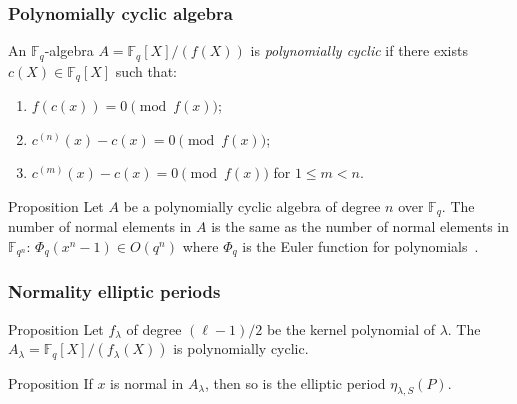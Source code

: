 \documentclass[francais]{beamer}
\def\F {\ensuremath{\mathbb{F}}}
\begin{document}
\begin{frame}\frametitle{Polynomially cyclic algebra}
  \begin{definition}
    An $\F_q$-algebra $A = \F_q[X]/(f(X))$ is \emph{polynomially cyclic}
    if there exists $c(X) \in \F_q[X]$ such that:
    \begin{enumerate}
    \item $f(c(x)) = 0 \pmod{f(x)}$;
    \item $c^{(n)}(x) - c(x) = 0 \pmod{f(x)}$;
    \item  $c^{(m)}(x) - c(x) = 0 \pmod{f(x)}$ for $1 \leq m < n$.
    \end{enumerate}
  \end{definition}

  \begin{block}{Proposition}
    Let $A$ be a polynomially cyclic algebra of degree $n$
    over $\F_q$.
    The number of normal elements in $A$ is the same as the
    number of normal elements in $\F_{q^{n}}$:
    $\Phi_q(x^{n}-1) \in O(q^{n})$ where $\Phi_q$ is the Euler function
    for polynomials~\cite{lidl+niederreiter:2}.
  \end{block}
\end{frame}

\begin{frame}\frametitle{Normality elliptic periods}
  \begin{block}{Proposition}
    Let $f_\lambda$ of degree $(\ell-1)/2$ be the kernel polynomial of $\lambda$.
    The $A_{\lambda} = \F_q[X] / (f_\lambda(X))$ is polynomially cyclic.
  \end{block}

  \bigskip
  
  \begin{block}{Proposition}
    If $x$ is normal in $A_{\lambda}$, then so is the elliptic period $\eta_{\lambda,S}(P)$.
  \end{block}
\end{frame}
\end{document}
